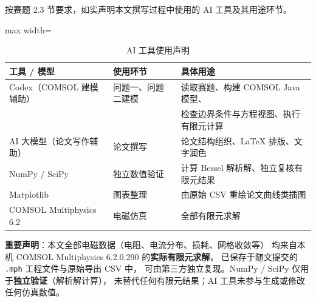 \documentclass[12pt, a4paper]{ctexart}
\begin{document}
按赛题 2.3 节要求，如实声明本文撰写过程中使用的 AI 工具及其用途环节。

\begin{table}[H]
\centering
\caption{AI 工具使用声明}
\label{tab:appendix-ai}
\small
\begin{adjustbox}{max width=\textwidth}
\begin{tabular}{l l l}
\toprule
\textbf{工具 / 模型} & \textbf{使用环节} & \textbf{具体用途} \\
\midrule
Codex（COMSOL 建模辅助） & 问题一、问题二建模 & 读取赛题、构建 COMSOL Java 模型、 \\
 & & 检查边界条件与方程视图、执行有限元计算 \\
AI 大模型（论文写作辅助） & 论文撰写 & 论文结构组织、LaTeX 排版、文字润色 \\
NumPy / SciPy & 独立数值验证 & 计算 Bessel 解析解、独立复核有限元结果 \\
Matplotlib & 图表整理 & 由原始 CSV 重绘论文曲线类插图 \\
COMSOL Multiphysics 6.2 & 电磁仿真 & 全部有限元求解 \\
\bottomrule
\end{tabular}
\end{adjustbox}
\end{table}

\textbf{重要声明}：本文全部电磁数据（电阻、电流分布、损耗、网格收敛等）
均来自本机 COMSOL Multiphysics 6.2.0.290 的\textbf{实际有限元求解}，
已保存于随文提交的 \texttt{.mph} 工程文件与原始导出 CSV 中，
可由第三方独立复现。NumPy / SciPy 仅用于\textbf{独立验证}（解析解计算），
未替代任何有限元结果；AI 工具未参与生成或修改任何仿真数值。
\end{document}
